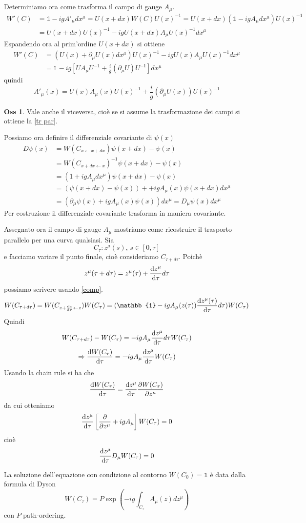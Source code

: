 \documentclass[10pt,a4paper]{article}
\theoremstyle{definition}
\newtheorem{observation}{Oss}[section]
\newcommand{\id}{\mathbb{1}}
\begin{document}
Determiniamo ora come trasforma il campo di gauge $A_\mu$.
\begin{align*}
W'(C) &= \id -  igA'_\mu dx^\mu = U(x + dx)W(C)U(x)^{-1} = U(x + dx)(\id - igA_\mu dx^\mu)U(x)^{-1} \\
&= U(x + dx)U(x)^{-1} - igU(x + dx)A_\mu U(x)^{-1}dx^{\mu}    
\end{align*}
Espandendo ora al prim'ordine $U(x + dx)$ si ottiene
\begin{align*}
    W'(C) &= (U(x) + \partial_\mu U(x)dx^\mu)U(x)^{-1} - igU(x)A_\mu U(x)^{-1}dx^\mu \\
    &= \id - ig [UA_\mu U^{-1} + \frac{i}{g} (\partial_\mu U)U^{-1}]dx^\mu
\end{align*}
quindi
\[
A'_\mu(x) = U(x)A_\mu(x)U(x)^{-1} + \frac{i}{g}(\partial_\mu U(x))U(x)^{-1}    
\]

\begin{observation}
    Vale anche il viceversa, cioè se si assume la trasformazione dei campi si ottiene la \ref{tr par}.
\end{observation}

Possiamo ora definire il differenziale covariante di $\psi(x)$
\begin{align*}
    D\psi(x) &= W(C_{x \leftarrow x + dx})\psi(x + dx) - \psi(x) \\
    &= W(C_{x + dx \leftarrow x})^{-1} \psi(x + dx) - \psi(x) \\
    &= (1 + igA_\mu dx^\mu)\psi(x + dx) - \psi(x) \\
    &= (\psi(x + dx) - \psi(x)) + +igA_\mu(x)\psi(x + dx)dx^\mu \\
    &= (\partial_\mu \psi(x) + igA_\mu (x)\psi(x))dx^\mu = D_\mu \psi(x)dx^\mu
\end{align*}
Per costruzione il differenziale covariante trasforma in maniera covariante.

Assegnato ora il campo di gauge $A_\mu$ mostriamo come ricostruire il trasporto parallelo per una curva qualsiasi. Sia
\[
C_\tau: z^\mu(s),\,s\in [0, \tau]
\]
e facciamo variare il punto finale, cioè consideriamo $C_{\tau + d\tau}$. Poichè
\[
z^\mu(\tau + d\tau) = z^\mu(\tau) + \dv{z^\mu}{\tau} d\tau    
\]
possiamo scrivere usando \ref{comp}.
\[
    W(C_{\tau + d\tau}) = W(C_{z + \dv{z}{\tau}\leftarrow z})W(C_\tau) = (\id - igA_\mu(z(\tau)) \dv{z^\mu(\tau)}{\tau}d\tau)W(C_\tau)
\]
Quindi
\[
W(C_{\tau + d\tau}) - W(C_\tau) = -igA_\mu \dv{z^\mu}{\tau}d\tau W(C_\tau)    
\]
\[
\Rightarrow \dv{W(C_\tau)}{\tau} = -igA_\mu\dv{z^\mu}{\tau}W(C_\tau)    
\]
Usando la chain rule si ha che
\[
\dv{W(C_\tau)}{\tau} = \dv{z^\mu}{\tau} \pdv{W(C_\tau)}{z^\mu}    
\]
da cui otteniamo
\[
\dv{z^\mu}{\tau}\left[\pdv{z^\mu} + igA_\mu\right]W(C_\tau)=0    
\]
cioè
\[
    \dv{z^\mu}{\tau}D_\mu W(C_\tau) = 0
\]

La soluzione dell'equazione con condizione al contorno $W(C_0) = \id$ è data dalla formula di Dyson
\[
W(C_\tau) = P \exp\left(-ig \int_{C_\tau}A_\mu(z)dz^\mu \right)    
\]
con $P$ path-ordering.
\end{document}
